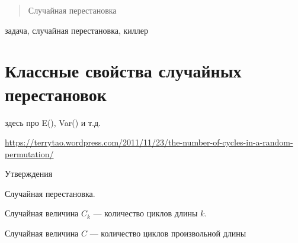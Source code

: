 \documentclass[10pt]{article}
\begin{document}


\DoFirstPageTechnicalStuff


\newtheorem{theorem}{Теорема}
\newtheorem{definition}{Определение}

\begin{abstract}
Случайная перестановка
\end{abstract}

\begin{keyword}
задача, случайная перестановка, киллер
\end{keyword}


\section{Классные свойства случайных перестановок}

здесь про E(), Var() и т.д.

\url{https://terrytao.wordpress.com/2011/11/23/the-number-of-cycles-in-a-random-permutation/}


Утверждения

Случайная перестановка. 

Случайная величина $C_k$ --- количество циклов длины $k$.

Случайная величина $C$ --- количество циклов произвольной длины
\end{document}
